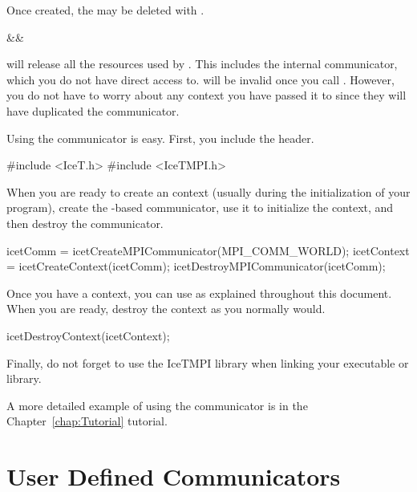 Once created, the  may be deleted with
.

\begin{Table}{3}
  \textC{(}&&\quad\textC{);}
\end{Table}

 will release all the resources used by
.  This includes the internal \MPI communicator, which you do
not have direct access to.   will be invalid once you call
.  However, you do not have to worry
about any \IceT context you have passed it to since they will have
duplicated the communicator.

Using the \MPI communicator is easy.  First, you include the
 header.

\begin{code}
#include <IceT.h>
#include <IceTMPI.h>
\end{code}

When you are ready to create an \IceT context (usually during the
initialization of your program), create the \MPI-based communicator, use it
to initialize the context, and then destroy the communicator.

\begin{code}
  icetComm = icetCreateMPICommunicator(MPI_COMM_WORLD);
  icetContext = icetCreateContext(icetComm);
  icetDestroyMPICommunicator(icetComm);
\end{code}

Once you have a context, you can use \IceT as explained throughout this
document.  When you are ready, destroy the context as you normally would.

\begin{code}
  icetDestroyContext(icetContext);
\end{code}

Finally, do not forget to use the IceTMPI
library when linking your executable or library.

A more detailed example of using the \MPI communicator is in the
Chapter~\ref{chap:Tutorial} tutorial.

\section{User Defined Communicators}
\label{sec:Communicators:User_Defined_Communicators}

